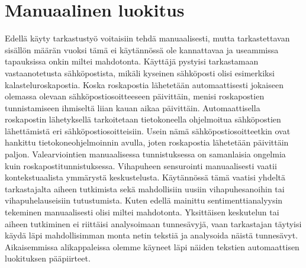 \section{Manuaalinen luokitus}

Edellä käyty tarkastustyö voitaisiin tehdä manuaalisesti, mutta tarkastettavan sisällön määrän vuoksi tämä ei käytännössä ole kannattavaa ja useammissa tapauksissa onkin miltei mahdotonta. Käyttäjä pystyisi tarkastamaan vastaanotetusta sähköpostista, mikäli kyseinen sähköposti olisi esimerkiksi kalasteluroskapostia. Koska roskapostia lähetetään automaattisesti jokaiseen olemassa olevaan sähköpostiosoitteeseen päivittäin, menisi roskapostien tunnistamiseen ihmiseltä liian kauan aikaa päivittäin. Automaattisella roskapostin lähetyksellä tarkoitetaan tietokoneella ohjelmoitua sähköpostien lähettämistä eri sähköpostiosoitteisiin. Usein nämä sähköpostiosoitteetkin ovat hankittu tietokoneohjelmoinnin avulla, joten roskapostia lähetetään päivittäin paljon. Valearviointien manuaalisessa tunnistuksessa on samanlaisia ongelmia kuin roskapostitunnistuksessa. Vihapuheen sensurointi manuaalisesti vaatii kontekstuaalista ymmärystä keskustelusta. Käytännössä tämä vaatisi yhdeltä tarkastajalta aiheen tutkimista sekä mahdollisiin uusiin vihapuhesanoihin tai vihapuhelauseisiin tutustumista. Kuten edellä mainittu sentimenttianalyysin tekeminen manuaalisesti olisi miltei mahdotonta. Yksittäisen keskutelun tai aiheen tutkiminen ei riittäisi analysoimaan tunnesävyjä, vaan tarkastajan täytyisi käydä läpi mahdollisimman monta netin tekstiä ja analysoida näistä tunnesävyt. Aikaisemmissa alikappaleissa olemme käyneet läpi näiden tekstien automaattisen luokituksen pääpiirteet.